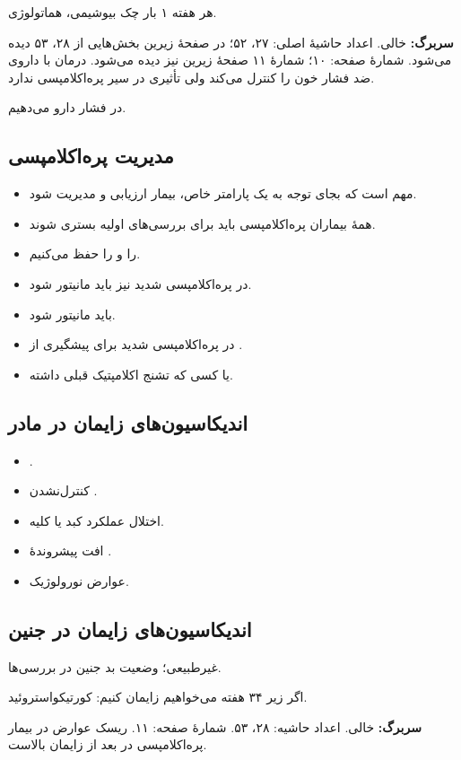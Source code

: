 \documentclass[12pt,a4paper]{article}
\begin{document}
هر هفته ۱ بار چک بیوشیمی، هماتولوژی.

\textbf{سربرگ:}  خالی. اعداد حاشیهٔ اصلی: ۲۷، ۵۲؛ در صفحهٔ زیرین بخش‌هایی از ۲۸، ۵۳ دیده می‌شود. شمارهٔ صفحه: ۱۰؛ شمارهٔ ۱۱ صفحهٔ زیرین نیز دیده می‌شود.
درمان با داروی ضد فشار خون  را کنترل می‌کند ولی تأثیری در سیر پره‌اکلامپسی ندارد.

در فشار  دارو می‌دهیم.
\subsection*{مدیریت پره‌اکلامپسی}
\begin{itemize}
\item مهم است که بجای توجه به یک پارامتر خاص،  بیمار ارزیابی و مدیریت شود. 
\item همهٔ بیماران پره‌اکلامپسی باید برای بررسی‌های اولیه بستری شوند.
\item {} را  و  را  حفظ می‌کنیم.
\item در پره‌اکلامپسی شدید  نیز باید مانیتور شود.
\item {} باید مانیتور شود.
\item در پره‌اکلامپسی شدید  برای پیشگیری از .
\item یا کسی که تشنج اکلامپتیک قبلی داشته.
\end{itemize}
\subsection*{اندیکاسیون‌های زایمان در مادر}
\begin{itemize}
\item {}.
\item کنترل‌نشدن .
\item اختلال عملکرد کبد یا کلیه.
\item افت پیشروندهٔ .
\item عوارض نورولوژیک.
\end{itemize}
\subsection*{اندیکاسیون‌های زایمان در جنین}
 غیرطبیعی؛ وضعیت بد جنین در بررسی‌ها.

اگر زیر ۳۴ هفته می‌خواهیم زایمان کنیم: کورتیکواستروئید.

\textbf{سربرگ:}  خالی. اعداد حاشیه: ۲۸، ۵۳. شمارهٔ صفحه: ۱۱.
ریسک عوارض در بیمار پره‌اکلامپسی در  بعد از زایمان بالاست.
\end{document}
